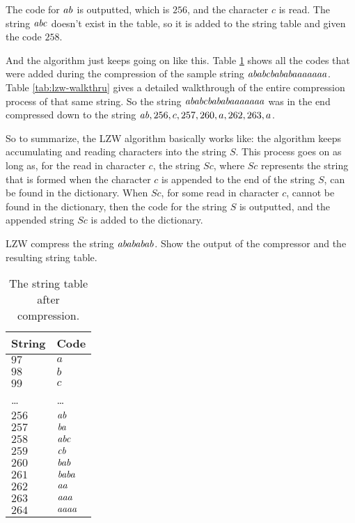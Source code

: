 The code for $\mathit{ab}$ is outputted, which is $256$, and the character $c$ is
read. The string $\mathit{abc}$ doesn't exist in the table, so it is
added to the string table and given the code $258$.

And the algorithm just keeps going on like this. Table
\ref{tab:str-tab-str} shows all the codes that were added during the
compression of the sample string $\mathit{ababcbababaaaaaaa}$. Table
\ref{tab:lzw-walkthru} gives a detailed walkthrough of the entire
compression process of that same string. So the string
$\mathit{ababcbababaaaaaaa}$ was in the end compressed down to the
string $\mathit{ab},256,c,257,260,a,262,263,a$.

So to summarize, the LZW algorithm basically works like: the algorithm
keeps accumulating and reading characters into the string $S$. This
process goes on as long as, for the read in character $c$, the string
$Sc$, where $Sc$ represents the string that is formed when the
character $c$ is appended to the end of the string $S$, can be found
in the dictionary. When $Sc$, for some read in character $c$, cannot
be found in the dictionary, then the code for the string $S$ is
outputted, and the appended string $Sc$ is added to the dictionary.

\begin{Exercise}[label={lzw-compress}]

  LZW compress the string $\mathit{abababab}$. Show the output of the
  compressor and the resulting string table.

\end{Exercise}

\begin{table}
  \centering
  \begin{tabular}{ll}
    \toprule
    String & Code \\
    \midrule
    $97$ & $a$ \\
    $98$ & $b$ \\
    $99$ & $c$ \\
    \dots & \dots \\
    $256$ & $\mathit{ab}$ \\
    $257$ & $\mathit{ba}$ \\
    $258$ & $\mathit{abc}$ \\
    $259$ & $\mathit{cb}$ \\
    $260$ & $\mathit{bab}$ \\
    $261$ & $\mathit{baba}$ \\
    $262$ & $\mathit{aa}$ \\
    $263$ & $\mathit{aaa}$ \\
    $264$ & $\mathit{aaaa}$ \\
    \bottomrule
  \end{tabular}
  \caption{The string table after compression.}
  \label{tab:str-tab-str}
\end{table}

